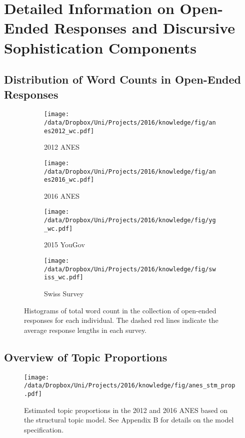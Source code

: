 \section[Information on Open-Ended Responses and Discursive Sophistication]{Detailed Information on Open-Ended Responses and Discursive Sophistication Components}
\renewcommand\thefigure{A.\arabic{figure}}
\renewcommand\thetable{A.\arabic{table}}
\setcounter{figure}{0}
\setcounter{table}{0}


\subsection{Distribution of Word Counts in Open-Ended Responses}

\begin{figure*}[h]
    \centering
    \begin{subfigure}[t]{0.49\textwidth}
        \centering
        \texttt{[image: /data/Dropbox/Uni/Projects/2016/knowledge/fig/anes2012\_wc.pdf]}
        \caption{2012 ANES}
    \end{subfigure}%
	\begin{subfigure}[t]{0.49\textwidth}
        \centering
        \texttt{[image: /data/Dropbox/Uni/Projects/2016/knowledge/fig/anes2016\_wc.pdf]}
        \caption{2016 ANES}
    \end{subfigure}%
    
    \begin{subfigure}[t]{0.49\textwidth}
        \centering
        \texttt{[image: /data/Dropbox/Uni/Projects/2016/knowledge/fig/yg\_wc.pdf]}
        \caption{2015 YouGov}
    \end{subfigure}
    \begin{subfigure}[t]{0.49\textwidth}
         \centering
         \texttt{[image: /data/Dropbox/Uni/Projects/2016/knowledge/fig/swiss\_wc.pdf]}
         \caption{Swiss Survey}
    \end{subfigure}
    \caption{Histograms of total word count in the collection of open-ended responses for each individual. The dashed red lines indicate the average response lengths in each survey.}\label{fig:wc}
\end{figure*}


\clearpage
\subsection{Overview of Topic Proportions}

\begin{figure}[h]\centering
\texttt{[image: /data/Dropbox/Uni/Projects/2016/knowledge/fig/anes\_stm\_prop.pdf]}
\caption{Estimated topic proportions in the 2012 and 2016 ANES based on the structural topic model. See Appendix B for details on the model specification.}\label{fig:anes_stm_prop}
\end{figure}

